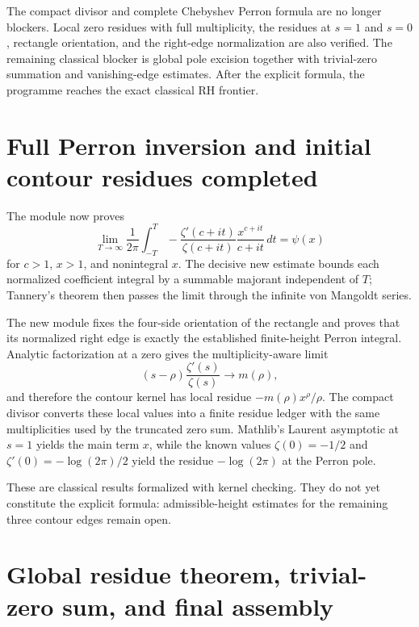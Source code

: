 \documentclass[11pt,a4paper]{article}
\begin{document}
\begin{resultbox}
The compact divisor and complete Chebyshev Perron formula are no longer
blockers. Local zero residues with full multiplicity, the residues at $s=1$
and $s=0$, rectangle orientation, and the right-edge normalization are also
verified. The remaining classical blocker is global pole excision together
with trivial-zero summation and vanishing-edge estimates. After the explicit
formula, the programme reaches the exact classical RH frontier.
\end{resultbox}

\section{Full Perron inversion and initial contour residues completed}

The module  now proves
\begin{equation}
  \lim_{T\to\infty}\frac{1}{2\pi}
  \int_{-T}^{T}-\frac{\zeta'(c+it)}{\zeta(c+it)}
    \frac{x^{c+it}}{c+it}\,dt=\psi(x)
\end{equation}
for $c>1$, $x>1$, and nonintegral $x$. The decisive new estimate bounds each
normalized coefficient integral by a summable majorant independent of $T$;
Tannery's theorem then passes the limit through the infinite von Mangoldt
series.

The new module  fixes the four-side
orientation of the rectangle and proves that its normalized right edge is
exactly the established finite-height Perron integral. Analytic factorization
at a zero gives the multiplicity-aware limit
\begin{equation}
  (s-\rho)\frac{\zeta'(s)}{\zeta(s)}\longrightarrow m(\rho),
\end{equation}
and therefore the contour kernel has local residue
$-m(\rho)x^\rho/\rho$. The compact divisor converts these local values into a
finite residue ledger with the same multiplicities used by the truncated zero
sum. Mathlib's Laurent asymptotic at $s=1$ yields the main term $x$, while the
known values $\zeta(0)=-1/2$ and
$\zeta'(0)=-\log(2\pi)/2$ yield the residue $-\log(2\pi)$ at the Perron pole.

These are classical results formalized with kernel checking. They do not yet
constitute the explicit formula: admissible-height estimates for the remaining
three contour edges remain open.

\section{Global residue theorem, trivial-zero sum, and final assembly}
\end{document}

